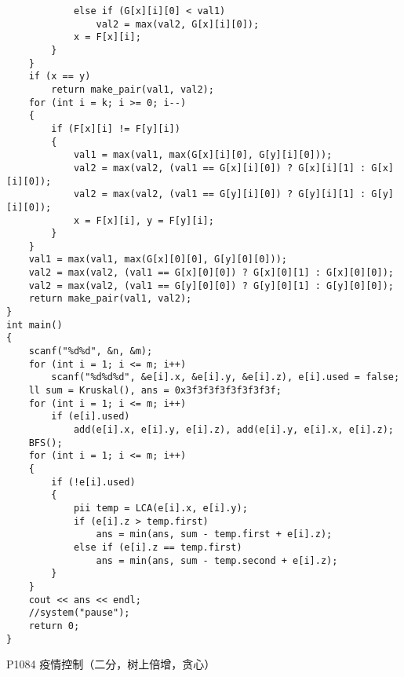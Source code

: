 \begin{lstlisting}
            else if (G[x][i][0] < val1)
                val2 = max(val2, G[x][i][0]);
            x = F[x][i];
        }
    }
    if (x == y)
        return make_pair(val1, val2);
    for (int i = k; i >= 0; i--)
    {
        if (F[x][i] != F[y][i])
        {
            val1 = max(val1, max(G[x][i][0], G[y][i][0]));
            val2 = max(val2, (val1 == G[x][i][0]) ? G[x][i][1] : G[x][i][0]);
            val2 = max(val2, (val1 == G[y][i][0]) ? G[y][i][1] : G[y][i][0]);
            x = F[x][i], y = F[y][i];
        }
    }
    val1 = max(val1, max(G[x][0][0], G[y][0][0]));
    val2 = max(val2, (val1 == G[x][0][0]) ? G[x][0][1] : G[x][0][0]);
    val2 = max(val2, (val1 == G[y][0][0]) ? G[y][0][1] : G[y][0][0]);
    return make_pair(val1, val2);
}
int main()
{
    scanf("%d%d", &n, &m);
    for (int i = 1; i <= m; i++)
        scanf("%d%d%d", &e[i].x, &e[i].y, &e[i].z), e[i].used = false;
    ll sum = Kruskal(), ans = 0x3f3f3f3f3f3f3f3f;
    for (int i = 1; i <= m; i++)
        if (e[i].used)
            add(e[i].x, e[i].y, e[i].z), add(e[i].y, e[i].x, e[i].z);
    BFS();
    for (int i = 1; i <= m; i++)
    {
        if (!e[i].used)
        {
            pii temp = LCA(e[i].x, e[i].y);
            if (e[i].z > temp.first)
                ans = min(ans, sum - temp.first + e[i].z);
            else if (e[i].z == temp.first)
                ans = min(ans, sum - temp.second + e[i].z);
        }
    }
    cout << ans << endl;
    //system("pause");
    return 0;
}
\end{lstlisting}

P1084 疫情控制（二分，树上倍增，贪心）